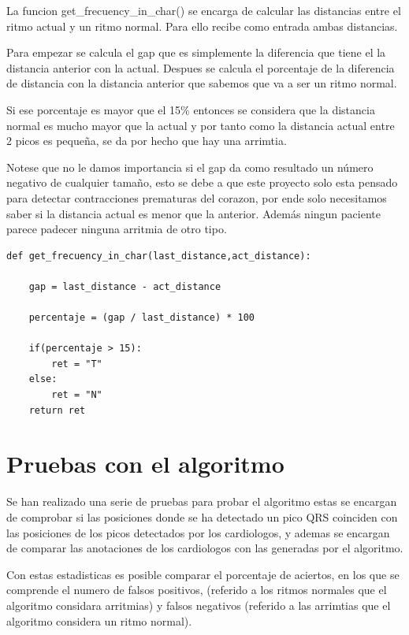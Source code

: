 La funcion get\_frecuency\_in\_char() se encarga de calcular las distancias entre el ritmo actual y un ritmo normal. 
Para ello recibe como entrada ambas distancias.

Para empezar se calcula el gap que es simplemente la diferencia que tiene el la distancia anterior con la actual.
Despues se calcula el porcentaje de la diferencia de distancia con la distancia anterior que sabemos que va a ser 
un ritmo normal.

Si ese porcentaje es mayor que el 15\% entonces se considera que la distancia normal es mucho mayor que la actual
y por tanto como la distancia actual entre 2 picos es pequeña, se da por hecho que hay una arrimtia.

Notese que no le damos importancia si el gap da como resultado un número negativo de cualquier tamaño, esto se debe
a que este proyecto solo esta pensado para detectar contracciones prematuras del corazon, por ende solo necesitamos 
saber si la distancia actual es menor que la anterior. Además ningun paciente parece padecer ninguna arritmia de otro
tipo.

\lstset{language=python, breaklines=true, basicstyle=\footnotesize}
\begin{lstlisting}[frame=single]
def get_frecuency_in_char(last_distance,act_distance): 

    gap = last_distance - act_distance

    percentaje = (gap / last_distance) * 100

    if(percentaje > 15):
        ret = "T"
    else:
        ret = "N"
    return ret

\end{lstlisting}

\section{Pruebas con el algoritmo}

Se han realizado una serie de pruebas para probar el algoritmo estas se encargan de comprobar si las posiciones donde
se ha detectado un pico QRS coinciden con las posiciones de los picos detectados por los cardiologos, y ademas se 
encargan de comparar las anotaciones de los cardiologos con las generadas por el algoritmo.

Con estas estadisticas es posible comparar el porcentaje de aciertos, en los que se comprende el numero de 
falsos positivos, (referido a los ritmos normales que el algoritmo considara arritmias) y 
falsos negativos (referido a las arrimtias que el algoritmo considera un ritmo normal).

